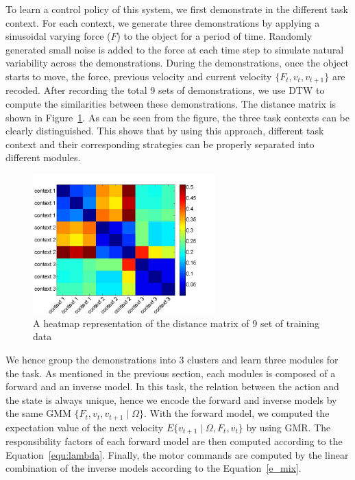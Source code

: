 
To learn a control policy of this system, we first demonstrate in the different task context. For each context, we generate three demonstrations by applying a sinusoidal varying force ($F$) to the object for a period of time. Randomly generated small noise is added to the force at each time step to simulate natural variability across the demonstrations. During the demonstrations, once the object starts to move, the force, previous velocity and current velocity $\{F_t, v_t, v_{t+1}\}$ are recoded. After recording the total 9 sets of demonstrations, we use DTW to compute the similarities between these demonstrations. The distance matrix is shown in Figure~\ref{fig:heatmap_sim}. As can be seen from the figure, the three task contexts can be clearly distinguished. This shows that by using this approach, different task context and their corresponding strategies can be properly separated into different modules.

\begin{figure}
  \centering
  \includegraphics[width=7cm]{./fig/contexts.jpg}
  \caption{ \scriptsize{A heatmap representation of the distance matrix of 9 set of training data}
}
\label{fig:heatmap_sim}
\end{figure}

We hence group the demonstrations into 3 clusters and learn three modules for the task. As mentioned in the previous section, each modules is composed of a forward and an inverse model. In this task, the relation between the action and the state is always unique, hence we encode the forward and inverse models by the same GMM $\{F_t, v_t, v_{t+1}\mid \Omega\}$. With the forward model, we computed the expectation value of the next velocity $E\{v_{t+1}\mid \Omega,F_t,v_t\}$ by using GMR. The responsibility factors of each forward model are then computed according to the Equation~\ref{equ:lambda}. Finally, the motor commands are computed by the linear combination of the inverse models according to the Equation~\ref{e_mix}.

